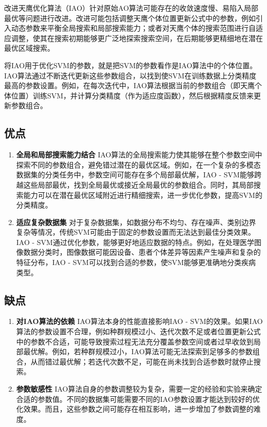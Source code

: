 \documentclass[12pt]{article}
\begin{document}
改进天鹰优化算法（IAO）针对原始AO算法可能存在的收敛速度慢、易陷入局部最优等问题进行改进。改进可能包括调整天鹰个体位置更新公式中的参数，例如引入动态参数来平衡全局搜索和局部搜索能力；或者对天鹰个体的搜索范围进行自适应调整，使其在搜索初期能够更广泛地探索搜索空间，在后期能够更精细地在潜在最优区域搜索。

将IAO用于优化SVM的参数，就是把SVM的参数看作是IAO算法中的个体位置。IAO算法通过不断迭代更新这些参数组合，以找到使SVM在训练数据上分类精度最高的参数设置。例如，在每次迭代中，IAO算法根据当前的参数组合（即天鹰个体位置）训练SVM，并计算分类精度（作为适应度函数），然后根据精度反馈来更新参数组合。

\subsection{优点}
\begin{enumerate}
    \item \textbf{全局和局部搜索能力结合}
    IAO算法的全局搜索能力使其能够在整个参数空间中探索不同的参数组合，避免错过潜在的最优区域。例如，在一个复杂的多模态数据集的分类任务中，参数空间可能存在多个局部最优解，IAO - SVM能够跨越这些局部最优，找到全局最优或接近全局最优的参数组合。同时，其局部搜索能力可以在潜在最优区域附近进行精细搜索，进一步优化参数，提高SVM的分类精度。
    \item \textbf{适应复杂数据集}
    对于复杂数据集，如数据分布不均匀、存在噪声、类别边界复杂等情况，传统SVM可能由于固定的参数设置而无法达到最佳分类效果。IAO - SVM通过优化参数，能够更好地适应数据的特点。例如，在处理医学图像数据分类时，图像数据可能因设备、患者个体差异等因素产生噪声和复杂的特征分布，IAO - SVM可以找到合适的参数，使SVM能够更准确地分类疾病类型。
\end{enumerate}

\subsection{缺点}
\begin{enumerate}
    \item \textbf{对IAO算法的依赖}
    IAO算法本身的性能直接影响IAO - SVM的效果。如果IAO算法的参数设置不合理，例如种群规模过小、迭代次数不足或者位置更新公式中的参数不合适，可能导致搜索过程无法充分覆盖参数空间或者过早收敛到局部最优解。例如，若种群规模过小，IAO算法可能无法探索到足够多的参数组合，从而错过最优解；若迭代次数不足，可能在尚未找到合适参数时就停止搜索。
    \item \textbf{参数敏感性}
    IAO算法自身的参数调整较为复杂，需要一定的经验和实验来确定合适的参数值。不同的数据集可能需要不同的IAO参数设置才能达到较好的优化效果。而且，这些参数之间可能存在相互影响，进一步增加了参数调整的难度。
\end{enumerate}
\end{document}
